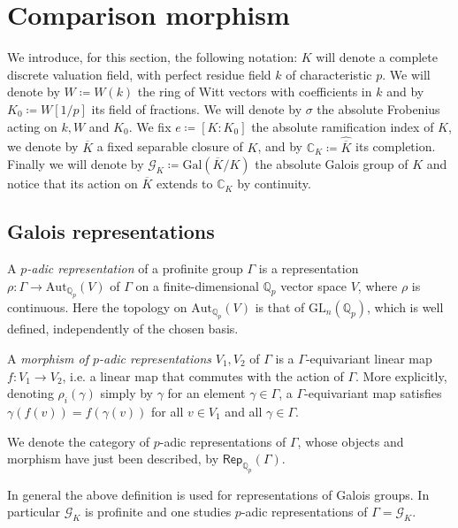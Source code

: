 \section{Comparison morphism}
We introduce, for this section, the following notation:
$K$ will denote a complete discrete valuation field, 
with perfect residue field $k$ of characteristic $p$.
We will denote by $W \coloneqq W(k)$ the ring of Witt vectors with coefficients in $k$
and by $K_0 \coloneqq W[1/p]$ its field of fractions.
We will denote by $\sigma$ the absolute Frobenius acting
on $k, W$ and $K_0$.
We fix $e \coloneqq [ K : K_0 ]$ the absolute ramification index of $K$,
we denote by $\overline{K}$ a fixed separable closure of $K$,
and by $\mathbb{C}_K \coloneqq \widehat{\overline{K}}$ its completion.
Finally we will denote by $\mathscr{G}_K \coloneqq \mathrm{Gal}\left( \overline{K} / K \right)$ 
the absolute Galois group of $K$ and notice that its action on $\overline{K}$
extends to $\mathbb{C}_K$ by continuity.



\subsection{Galois representations}
\begin{defn}
	A {\em $p$-adic representation} of a profinite group $\Gamma$ is a
	representation $\rho\colon \Gamma \to \mathrm{Aut}_{\mathbb{Q}_p}(V)$
	of $\Gamma$ on a finite-dimensional $\mathbb{Q}_p$ vector space
	$V$, where $\rho$ is continuous.
	Here the topology on $\mathrm{Aut}_{\mathbb{Q}_p}(V)$ is
	that of $\mathrm{GL}_n(\mathbb{Q}_p)$, which is well defined,
	independently of the chosen basis.

	A {\em morphism of $p$-adic representations} $V_1, V_2$ of $\Gamma$
	is a $\Gamma$-equivariant linear map $f\colon V_1 \to V_2$, 
	i.e. a linear map that commutes with the action of $\Gamma$.
	More explicitly, denoting $\rho_i(\gamma)$ simply by $\gamma$ for
	an element $\gamma \in \Gamma$, a $\Gamma$-equivariant
	map satisfies $\gamma(f(v)) = f(\gamma(v))$
	for all $v \in V_1$ and all $\gamma \in \Gamma$.

	We denote the category of $p$-adic representations of $\Gamma$,
	whose objects and morphism have just been described,
	by $\mathsf{Rep}_{\mathbb{Q}_p}(\Gamma)$.
\end{defn}


\begin{rem}[]
	In general the above definition is used for representations of Galois groups.
	In particular $\mathscr{G}_K$ is profinite and one studies
	$p$-adic representations of $\Gamma = \mathscr{G}_K$.
\end{rem}


